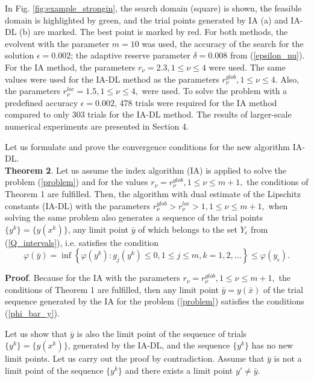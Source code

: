 \documentclass[preprint]{elsarticle}
\begin{document}
	In Fig. \ref{fig:example_strongin}, the search domain (square) is shown, the feasible domain is highlighted by green, and the trial points generated by IA (a) and IA-DL (b) are marked. The best point is marked by red. For both methods, the evolvent with the parameter $m=10$ was used, the accuracy of the search for the solution $\epsilon=0.002$; the adaptive reserve parameter $\delta=0.008$ from (\ref{epsilon_nu}). For the IA method, the parameters $r_{\nu}=2.3, 1 \leq \nu \leq 4$ were used. The same values were used for the IA-DL method as the parameters $r_{\nu}^{glob}, 1 \leq \nu \leq 4$. Also, the parameters $r_{\nu}^{loc}=1.5, 1 \leq \nu \leq 4,$ were used. To solve the problem with a predefined accuracy $\epsilon=0.002$, 478 trials were required for the IA method compared to only 303 trials for the IA-DL method. The results of larger-scale numerical experiments are presented in Section 4.

	Let us formulate and prove the convergence conditions for the new algorithm IA-DL.\\
\textbf{Theorem 2}. Let us assume the index algorithm (IA) is applied to solve the problem (\ref{problem}) and for the values $r_{\nu}=r_{\nu}^{glob}, 1 \leq \nu \leq m+1,$ the conditions of Theorem 1 are fulfilled. Then, the algorithm with dual estimate of the Lipschitz constants (IA-DL) with the parameters $r_{\nu}^{glob}>r_{\nu}^{loc}>1, 1\leq \nu \leq m+1,$ when solving the same problem also generates a sequence of the trial points $\{y^k\}=\{y(x^k)\}$, any limit point $\bar{y}$ of which belongs to the set $Y_{\epsilon}$ from (\ref{Q_intervals}), i.e. satisfies the condition 
\begin{equation}\label{phi_bar_y}
	\varphi(\bar y) = \inf\left\{\varphi(y^k):g_j(y^k) \leq 0, 1 \leq j \leq m, k = 1,2,\ldots \right\} \leq \varphi(y_{\epsilon}).
\end{equation}

\textbf{Proof}. Because for the IA with the parameters $r_{\nu}=r_{\nu}^{glob}, 1 \leq \nu \leq m+1,$ the conditions of Theorem 1 are fulfilled, then any limit point $\bar{y}=y(\bar{x})$ of the trial sequence generated by the IA for the problem (\ref{problem}) satisfies the conditions (\ref{phi_bar_y}).

	Let us show that $\bar y$ is also the limit point of the sequence of trials $\{y^k\}=\{y(x^k)\}$, generated by the IA-DL, and the sequence $\{y^k\}$ has no new limit points. Let us carry out the proof by contradiction. Assume that $\bar y$ is not a limit point of the sequence $\{y^k\}$ and there exists a limit point $y' \neq \bar y$.
\end{document}
